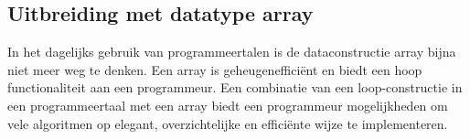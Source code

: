 \subsection{Uitbreiding met datatype array}
In het dagelijks gebruik van programmeertalen is de dataconstructie array bijna niet meer weg te denken. Een array is geheugeneffici\"{e}nt en biedt een hoop functionaliteit aan een programmeur. Een combinatie van een loop-constructie in een programmeertaal met een array biedt een programmeur mogelijkheden om vele algoritmen op elegant, overzichtelijke en effici\"{e}nte wijze te implementeren.
